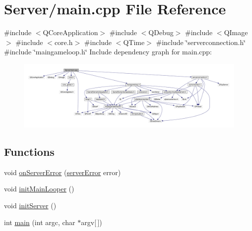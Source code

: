 \hypertarget{a00241}{}\section{Server/main.cpp File Reference}
\label{a00241}
{\ttfamily \#include $<$Q\+Core\+Application$>$}\newline
{\ttfamily \#include $<$Q\+Debug$>$}\newline
{\ttfamily \#include $<$Q\+Image$>$}\newline
{\ttfamily \#include $<$core.\+h$>$}\newline
{\ttfamily \#include $<$Q\+Time$>$}\newline
{\ttfamily \#include \char`\"{}serverconnection.\+h\char`\"{}}\newline
{\ttfamily \#include \char`\"{}maingameloop.\+h\char`\"{}}\newline
Include dependency graph for main.\+cpp\+:
\nopagebreak
\begin{figure}[H]
\begin{center}
\leavevmode
\includegraphics[width=350pt]{d2/dc8/a00242}
\end{center}
\end{figure}
\subsection*{Functions}
\begin{DoxyCompactItemize}
\item 
void \hyperlink{a00241_ab19c8b3d71e5789a489786830449e94b}{on\+Server\+Error} (\hyperlink{a00104_a65727a063024ff0dedf1ac2f087f4165}{server\+Error} error)
\item 
void \hyperlink{a00241_a3cfb6b17f20d62ad08b9402764f3aa6c}{init\+Main\+Looper} ()
\item 
void \hyperlink{a00241_a29060721f5ddfa26790f0778bde74ff2}{init\+Server} ()
\item 
int \hyperlink{a00241_a0ddf1224851353fc92bfbff6f499fa97}{main} (int argc, char $\ast$argv\mbox{[}$\,$\mbox{]})
\end{DoxyCompactItemize}


